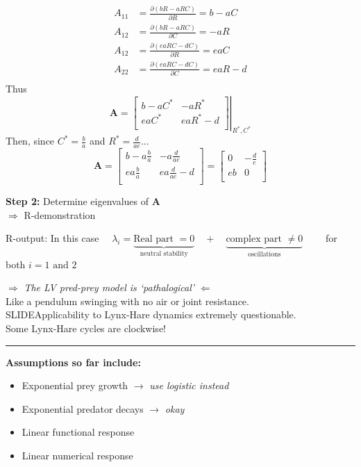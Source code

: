 \documentclass{article}
\newcommand{\note}[1]{\colorbox{gray!30}{#1}}
\newcommand{\ind}{\-\hspace{1cm}}
\begin{document}
\begin{align*}
	A_{11} &= \frac{ \partial (bR-aRC)}{\partial R} = b-aC\\
		A_{12} &= \frac{ \partial (bR-aRC)}{\partial C} = -aR\\
			A_{12} &= \frac{ \partial (eaRC-dC)}{\partial R} = eaC\\
				A_{22} &= \frac{ \partial (eaRC-dC)}{\partial C} = eaR-d\\
\end{align*}
Thus
\begin{equation*}
	\mathbf{A}=
\left.	\begin{bmatrix}
		b-a C^* & -aR^*\\[1em]
		eaC^* & eaR^*-d\\
	\end{bmatrix}
	\right |_{R^*,C^*}
\end{equation*}
Then, since $C^*=\frac{b}{a}$ and $R^*=\frac{d}{ae}$...
\begin{equation*}
	\mathbf{A}=
	\begin{bmatrix}
		b-a \frac{b}{a} & -a \frac{d}{ae}\\[1em]
		ea\frac{b}{a} & ea\frac{d}{ae}-d\\
	\end{bmatrix}
	=\begin{bmatrix}
			0 & -\frac{d}{e}\\[1em]
			eb & 0\\
	\end{bmatrix}
\end{equation*}

\textbf{Step 2:} Determine eigenvalues of $\mathbf{A}$\\
\ind \note{$\Rightarrow $ R-demonstration}

\ind R-output: In this case $\quad \lambda_i = \underbrace{\text{Real part }= 0}_{\text{neutral stability}} \quad + \quad \underbrace{\text{complex part }\neq 0}_{\text{oscillations}} \quad \quad $ for both $i=1 \text{ and } 2$

\vspace{0.3cm}
\begin{center}
	$\Rightarrow$ \emph{The LV pred-prey model is `pathalogical'} $\Leftarrow$\\
	Like a pendulum swinging with no air or joint resistance.\\
	\note{SLIDE}Applicability to Lynx-Hare dynamics extremely questionable.\\
	Some Lynx-Hare cycles are clockwise!
\end{center}
\rule[0.5ex]{\linewidth}{1pt}
\textbf{Assumptions so far include:}
\begin{itemize}
\setlength\itemsep{0em}
	\item Exponential prey growth $\rightarrow$ \emph{use logistic instead}
	\item Exponential predator decays $\rightarrow$ \emph{okay}
	\item Linear functional response
	\item Linear numerical response
\end{itemize}
\end{document}
